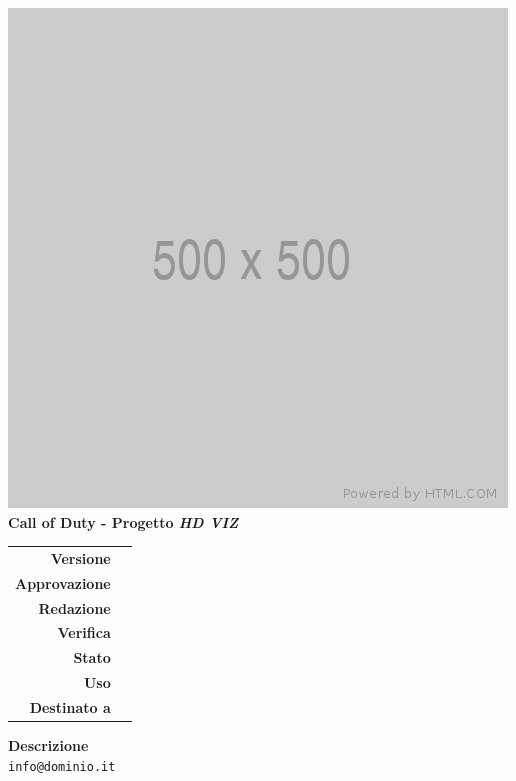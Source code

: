 %
%

\begin{titlepage}

	\begin{center}
		\includegraphics[scale = 0.5]{template/images/logo.png}\\
		\large \textbf{Call of Duty - Progetto \emph{HD VIZ}} \\
		\vfill
		\huge \textbf{\titolodocumento}
		\vspace*{\fill}
        
        \vfill
        \large
    \end{center}
    
	\begin{table}[htbp]
        \centering
        \begin{tabular}{r|l}
            \textbf{Versione} & \versione{} \\
            \textbf{Approvazione} & \approvazione{} \\
            \textbf{Redazione} & \redazione{} \\
            \textbf{Verifica} & \verifica{} \\
            \textbf{Stato} & \stato{} \\
            \textbf{Uso} & \uso{} \\
            \textbf{Destinato a} & \destinazione{}
        \end{tabular}
    \end{table}
    
    \begin{center}
        \vfill
        \normalsize
        \textbf{Descrizione}\\
		\descrizionedocumento
        \vfill
        \small
        \texttt{info@dominio.it}
	\end{center}
\end{titlepage}

%
